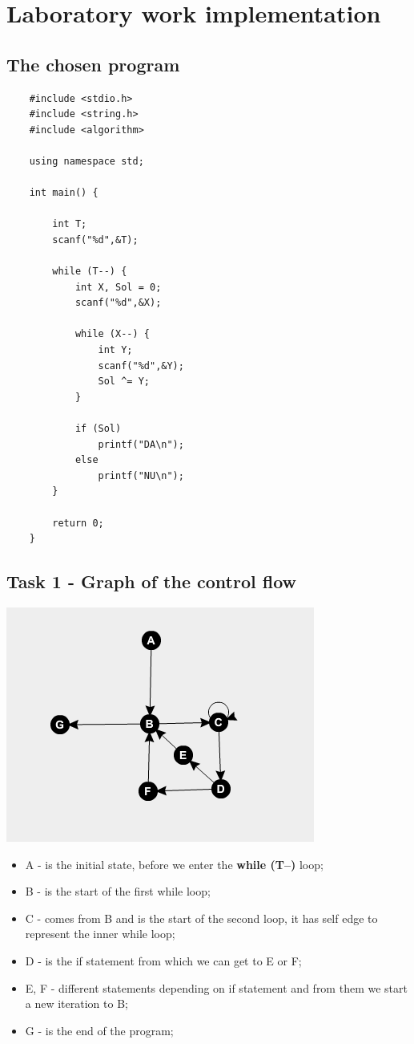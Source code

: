 \section{Laboratory work implementation} 

\subsection{The chosen program}
\begin{lstlisting}
	#include <stdio.h>
	#include <string.h>
	#include <algorithm>
	
	using namespace std;
	
	int main() {
	
		int T;
		scanf("%d",&T);
	
		while (T--) {
			int X, Sol = 0;
			scanf("%d",&X);
			
			while (X--) {
				int Y;
				scanf("%d",&Y);
				Sol ^= Y;
			}
	
			if (Sol)
				printf("DA\n");
			else
				printf("NU\n");
		}
	
		return 0;
	}
\end{lstlisting}

\subsection{Task 1 - Graph of the control flow}

\begin{center}
	\includegraphics[scale=1]{images/Capture2}
	\vspace{1cm}
\end{center}

\begin{itemize}
	\item A - is the initial state, before we enter the \textbf{while (T--)} loop;
	\item B - is the start of the first while loop;
	\item C - comes from B and is the start of the second loop, it has self edge to represent the inner while loop;
	\item D - is the if statement from which we can get to E or F;
	\item E, F - different statements depending on if statement and from them we start a new iteration to B;
	\item G - is the end of the program;
\end{itemize}


